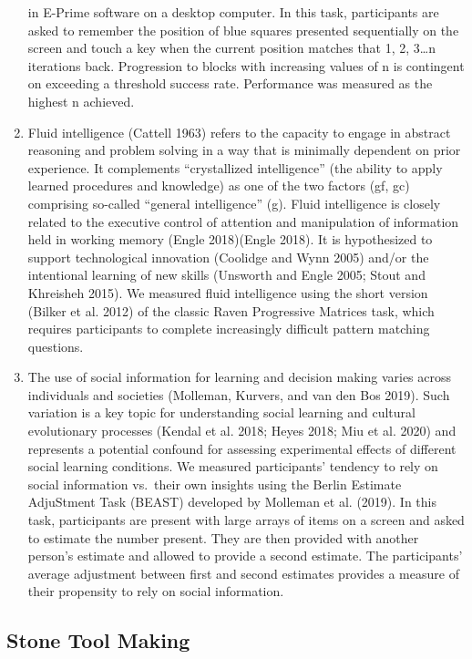 \documentclass[smallextended]{svjour3}       %
\begin{document}
\begin{enumerate}
  in E-Prime software on a desktop computer. In this task, participants
  are asked to remember the position of blue squares presented
  sequentially on the screen and touch a key when the current position
  matches that 1, 2, 3\ldots n iterations back. Progression to blocks
  with increasing values of n is contingent on exceeding a threshold
  success rate. Performance was measured as the highest n achieved.
\item
  Fluid intelligence (Cattell 1963) refers to the capacity to engage in
  abstract reasoning and problem solving in a way that is minimally
  dependent on prior experience. It complements ``crystallized
  intelligence'' (the ability to apply learned procedures and knowledge)
  as one of the two factors (gf, gc) comprising so-called ``general
  intelligence'' (g). Fluid intelligence is closely related to the
  executive control of attention and manipulation of information held in
  working memory (Engle 2018)(Engle 2018). It is hypothesized to support
  technological innovation (Coolidge and Wynn 2005) and/or the
  intentional learning of new skills (Unsworth and Engle 2005; Stout and
  Khreisheh 2015). We measured fluid intelligence using the short
  version (Bilker et al. 2012) of the classic Raven Progressive Matrices
  task, which requires participants to complete increasingly difficult
  pattern matching questions.~~
\item
  The use of social information for learning and decision making varies
  across individuals and societies (Molleman, Kurvers, and van den Bos
  2019). Such variation is a key topic for understanding social learning
  and cultural evolutionary processes (Kendal et al. 2018; Heyes 2018;
  Miu et al. 2020) and represents a potential confound for assessing
  experimental effects of different social learning conditions. We
  measured participants' tendency to rely on social information
  vs.~their own insights using the Berlin Estimate AdjuStment Task
  (BEAST) developed by Molleman et al. (2019). In this task,
  participants are present with large arrays of items on a screen and
  asked to estimate the number present. They are then provided with
  another person's estimate and allowed to provide a second estimate.
  The participants' average adjustment between first and second
  estimates provides a measure of their propensity to rely on social
  information.
\end{enumerate}

\hfill\break

\hypertarget{stone-tool-making}{%
\subsection{\texorpdfstring{\textbf{Stone Tool
Making}}{Stone Tool Making}}\label{stone-tool-making}}
\end{document}
